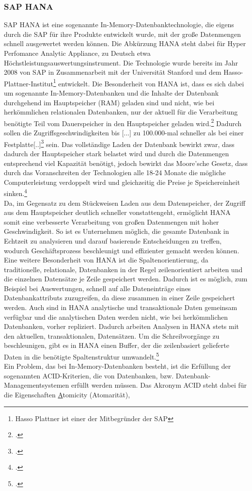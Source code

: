 \subsubsection{SAP HANA}
\label{kap:HANA}
SAP HANA ist eine sogenannte \glqq{}In-Memory\grqq{}-Datenbanktechnologie, die eigens durch die SAP für ihre Produkte entwickelt wurde, mit der große Datenmengen schnell ausgewertet werden können. Die Abkürzung HANA steht dabei für \glqq{}Hyper Perfomance Analytic Appliance\grqq{}, zu Deutsch etwa \glqq{}Höchstleistungsauswertungsinstrument\grqq{}. Die Technologie wurde bereits im Jahr 2008 von SAP in Zusammenarbeit mit der Universität Stanford und dem Hasso-Plattner-Institut\footnote{Hasso Plattner ist einer der Mitbegründer der SAP} entwickelt. Die Besonderheit von HANA ist, dass es sich dabei um sogenannte \glqq{}In-Memory-Datenbanken\grqq{} und die Inhalte der Datenbank durchgehend im Hauptspeicher (RAM) geladen sind und nicht, wie bei herkömmlichen relationalen Datenbanken, nur der aktuell für die Verarbeitung benötigte Teil vom Dauerspeicher in den Hauptspeicher geladen wird.\footcite[Vgl.][]{was-hana} Dadurch sollen die Zugriffsgeschwindigkeiten bis \glqq{}[...] zu 100.000-mal schneller als bei einer Festplatte[..]\grqq{}\footcite[Vgl.][]{rz10-hana} sein. Das vollständige Laden der Datenbank bewirkt zwar, dass dadurch der Hauptspeicher stark belastet wird und durch die Datenmengen entsprechend viel Kapazität benötigt, jedoch bewirkt das Moore'sche Gesetz, dass durch das Voranschreiten der Technologien alle 18-24 Monate die mögliche Computerleistung verdoppelt wird und gleichzeitig die Preise je Speichereinheit sinken.\footcite[Vgl.][]{mooresches}\\ Da, im Gegensatz zu dem Stückweisen Laden aus dem Datenspeicher, der Zugriff aus dem Hauptspeicher deutlich schneller vonstattengeht, ermöglicht HANA somit eine verbesserte Verarbeitung von großen Datenmengen mit hoher Geschwindigkeit. So ist es Unternehmen möglich, die gesamte Datenbank in Echtzeit zu analysieren und darauf basierende Entscheidungen zu treffen, wodurch Geschäftsprozess beschleunigt und effizienter gemacht werden können. Eine weitere Besonderheit von HANA ist die Spaltenorientierung, da traditionelle, relationale, Datenbanken in der Regel zeilenorientiert arbeiten und die einzelnen Datensätze je Zeile gespeichert werden. Dadurch ist es möglich, zum Beispiel bei Auswertungen, schnell auf alle Dateneinträge eines Datenbankattributs zuzugreifen, da diese zusammen in einer Zeile gespeichert werden. Auch sind in HANA analytische und transaktionale Daten gemeinsam verfügbar und die analytischen Daten werden nicht, wie bei herkömmlichen Datenbanken, vorher repliziert. Dadurch arbeiten Analysen in HANA stets mit den aktuellen, transaktionalen, Datensätzen. Um die Schreibvorgänge zu beschleunigen, gibt es in HANA einen Buffer, der die zeilenbasiert gelieferte Daten in die benötigte Spaltenstruktur umwandelt.\footcite[Vgl.][]{was-hana}\\Ein Problem, das bei In-Memory-Datenbanken besteht, ist die Erfüllung der sogenannten ACID-Kriterien, die von Datenbanken, bzw. Datenbank-Managementsystemen erfüllt werden müssen. Das Akronym \glqq{}ACID\grqq{} steht dabei für die Eigenschaften \underline{A}tomicity (Atomarität), 